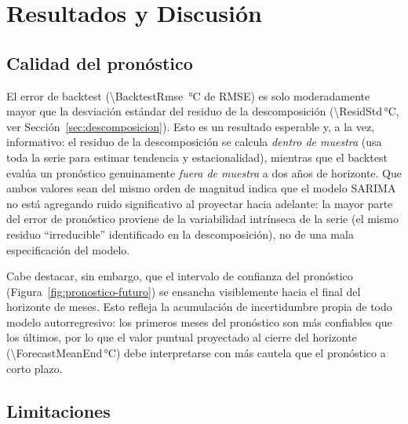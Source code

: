\section{Resultados y Discusión}
\label{sec:resultados-discusion}

\subsection{Calidad del pronóstico}

El error de backtest (\SI{\BacktestRmse}{\celsius} de RMSE) es solo moderadamente mayor que
la desviación estándar del residuo de la descomposición (\num{\ResidStd}\,°C, ver
Sección~\ref{sec:descomposicion}). Esto es un resultado esperable y, a la vez, informativo:
el residuo de la descomposición se calcula \emph{dentro de muestra} (usa toda la serie para
estimar tendencia y estacionalidad), mientras que el backtest evalúa un pronóstico
genuinamente \emph{fuera de muestra} a dos años de horizonte. Que ambos valores sean del
mismo orden de magnitud indica que el modelo SARIMA no está agregando ruido significativo al
proyectar hacia adelante: la mayor parte del error de pronóstico proviene de la variabilidad
intrínseca de la serie (el mismo residuo ``irreducible'' identificado en la descomposición),
no de una mala especificación del modelo.

Cabe destacar, sin embargo, que el intervalo de confianza del pronóstico
(Figura~\ref{fig:pronostico-futuro}) se ensancha visiblemente hacia el final del horizonte de
\FutureHorizonMonths{} meses. Esto refleja la acumulación de incertidumbre propia de todo
modelo autorregresivo: los primeros meses del pronóstico son más confiables que los últimos,
por lo que el valor puntual proyectado al cierre del horizonte
(\num{\ForecastMeanEnd}\,°C) debe interpretarse con más cautela que el pronóstico a corto
plazo.

\subsection{Limitaciones}

